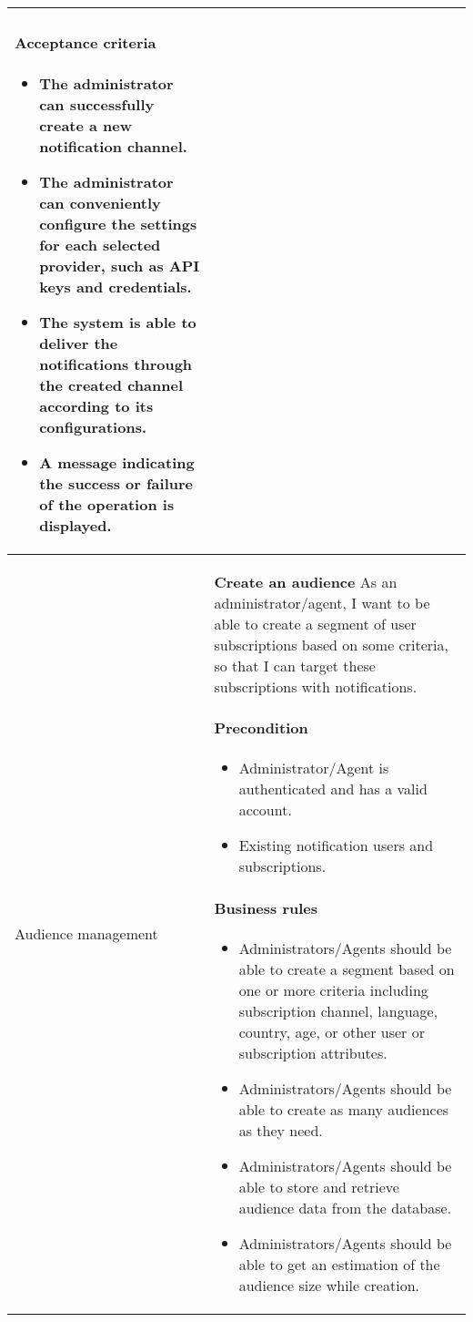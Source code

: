 \begin{longtable}{ | m{} | m{} | }
    \paragraph*{Acceptance criteria} \mbox{} \newline
    \begin{itemize}
        \item The administrator can successfully create a new notification channel.
        \item The administrator can conveniently configure the settings for each selected provider, such as API keys and credentials.
        \item The system is able to deliver the notifications through the created channel according to its configurations.
        \item A message indicating the success or failure of the operation is displayed.
    \end{itemize}                                                                                                                                          \\
    \hline
    Audience \newline management                       & \textbf{Create an audience} \newline As an administrator/agent, I want to be able to create a segment of user subscriptions based on some criteria, so that I can target these subscriptions with notifications.
    \paragraph*{Precondition} \mbox{} \newline
    \begin{itemize}
        \item Administrator/Agent is authenticated and has a valid account.
        \item Existing notification users and subscriptions.
    \end{itemize}
    \paragraph*{Business rules} \mbox{} \newline
    \begin{itemize}
        \item Administrators/Agents should be able to create a segment based on one or more criteria including subscription channel, language, country, age, or other user or subscription attributes.
        \item Administrators/Agents should be able to create as many audiences as they need.
        \item Administrators/Agents should be able to store and retrieve audience data from the database.
        \item Administrators/Agents should be able to get an estimation of the audience size while creation.
    \end{itemize}

\end{longtable}
